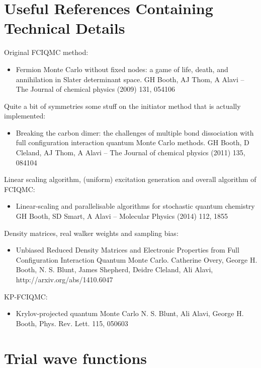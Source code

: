 \documentclass[a4paper,notitlepage,dvipsnames]{scrreprt}
\begin{document}
\section{Useful References Containing Technical Details}

Original FCIQMC method:
\begin{itemize}
\item Fermion Monte Carlo without fixed nodes: a game of life, death, and annihilation in Slater determinant space. \newline
GH Booth, AJ Thom, A Alavi – The Journal of chemical physics (2009) 131, 054106
\end{itemize}

Quite a bit of symmetries some stuff on the initiator method that is actually implemented:
\begin{itemize}
\item Breaking the carbon dimer: the challenges of multiple bond dissociation with full configuration interaction quantum Monte Carlo methods.
GH Booth, D Cleland, AJ Thom, A Alavi – The Journal of chemical physics (2011) 135, 084104
\end{itemize}

Linear scaling algorithm, (uniform) excitation generation and overall algorithm of FCIQMC:
\begin{itemize}
\item Linear-scaling and parallelisable algorithms for stochastic quantum chemistry
GH Booth, SD Smart, A Alavi – Molecular Physics (2014) 112, 1855
\end{itemize}

Density matrices, real walker weights and sampling bias:
\begin{itemize}
\item Unbiased Reduced Density Matrices and Electronic Properties from Full Configuration Interaction Quantum Monte Carlo.
Catherine Overy, George H. Booth, N. S. Blunt, James Shepherd, Deidre Cleland, Ali Alavi, http://arxiv.org/abs/1410.6047
\end{itemize}

KP-FCIQMC:
\begin{itemize}
\item Krylov-projected quantum Monte Carlo
N. S. Blunt, Ali Alavi, George H. Booth, Phys. Rev. Lett. 115, 050603
\end{itemize}

    \section{Trial wave functions}
    \label{sec:trial}
\end{document}
